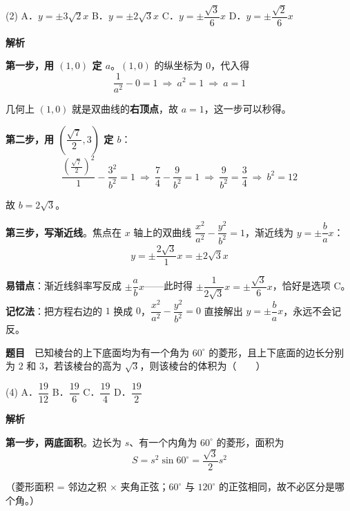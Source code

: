 \begin{gkopts}(2)
\task A．$y=\pm3\sqrt{2}x$
\task B．$y=\pm2\sqrt{3}x$
\task C．$y=\pm\dfrac{\sqrt{3}}{6}x$
\task D．$y=\pm\dfrac{\sqrt{2}}{6}x$
\end{gkopts}

\textbf{解析}

\textbf{第一步，用 $(1,0)$ 定 $a$}。$(1,0)$ 的纵坐标为 $0$，代入得
\[\frac{1}{a^2}-0=1\ \Longrightarrow\ a^2=1\ \Longrightarrow\ a=1\]

\begin{gktip}
几何上 $(1,0)$ 就是双曲线的\textbf{右顶点}，故 $a=1$，这一步可以秒得。
\end{gktip}

\textbf{第二步，用 $\left(\dfrac{\sqrt7}{2},3\right)$ 定 $b$}：
\[\frac{\left(\frac{\sqrt7}{2}\right)^2}{1}-\frac{3^2}{b^2}=1\ \Longrightarrow\ \frac74-\frac{9}{b^2}=1\ \Longrightarrow\ \frac{9}{b^2}=\frac34\ \Longrightarrow\ b^2=12\]

故 $b=2\sqrt3$。

\textbf{第三步，写渐近线}。焦点在 $x$ 轴上的双曲线 $\dfrac{x^2}{a^2}-\dfrac{y^2}{b^2}=1$，渐近线为 $y=\pm\dfrac{b}{a}x$：
\[y=\pm\frac{2\sqrt3}{1}x=\pm2\sqrt3x\]


\begin{gktip}
\textbf{易错点}：渐近线斜率写反成 $\pm\dfrac{a}{b}x$——此时得 $\pm\dfrac{1}{2\sqrt3}x=\pm\dfrac{\sqrt3}{6}x$，恰好是选项 C。\textbf{记忆法}：把方程右边的 $1$ 换成 $0$，$\dfrac{x^2}{a^2}-\dfrac{y^2}{b^2}=0$ 直接解出 $y=\pm\dfrac{b}{a}x$，永远不会记反。
\end{gktip}

\par\medskip


\textbf{题目}　已知棱台的上下底面均为有一个角为 $60^\circ$ 的菱形，且上下底面的边长分别为 $2$ 和 $3$，若该棱台的高为 $\sqrt{3}$，则该棱台的体积为（　　）

\begin{gkopts}(4)
\task A．$\dfrac{19}{12}$
\task B．$\dfrac{19}{6}$
\task C．$\dfrac{19}{4}$
\task D．$\dfrac{19}{2}$
\end{gkopts}

\textbf{解析}

\textbf{第一步，两底面积}。边长为 $s$、有一个内角为 $60^\circ$ 的菱形，面积为
\[S=s^2\sin60^\circ=\frac{\sqrt3}{2}s^2\]

（菱形面积 = 邻边之积 × 夹角正弦；$60^\circ$ 与 $120^\circ$ 的正弦相同，故不必区分是哪个角。）

